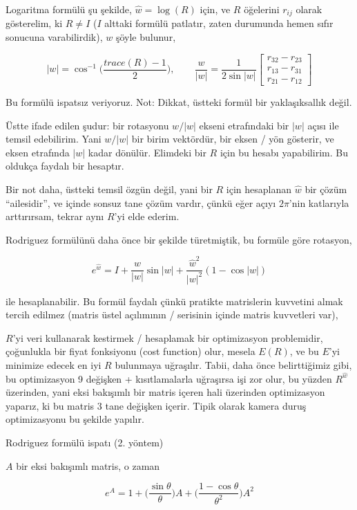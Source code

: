 \documentclass[12pt,fleqn]{article}\usepackage{../../common}
\begin{document}
Logaritma formülü şu şekilde, $\hat{w} = \log(R)$ için, ve $R$ öğelerini
$r_{ij}$ olarak gösterelim, ki $R \ne I$ ($I$ alttaki formülü patlatır,
zaten durumunda hemen sıfır sonucuna varabilirdik), $w$ şöyle bulunur,

$$ |w| = 
\cos^{-1} \bigg(
\frac{trace(R) - 1}{2}
\bigg), 
\qquad
\frac{w}{|w|} = 
\frac{1}{2 \sin |w|} 
\left[\begin{array}{r}
r_{32} - r_{23} \\ r_{13} - r_{31} \\ r_{21} - r_{12}
\end{array}\right]
 $$

Bu formülü ispatsız veriyoruz. Not: Dikkat, üstteki formül bir yaklaşıksallık
değil. 

Üstte ifade edilen şudur: bir rotasyonu $w/|w|$ ekseni etrafındaki bir
$|w|$ açısı ile temsil edebilirim. Yani $w/|w|$ bir birim vektördür, bir
eksen / yön gösterir, ve eksen etrafında $|w|$ kadar dönülür. Elimdeki bir
$R$ için bu hesabı yapabilirim. Bu oldukça faydalı bir hesaptır. 

Bir not daha, üstteki temsil özgün değil, yani bir $R$ için hesaplanan
$\hat{w}$ bir çözüm ``ailesidir'', ve içinde sonsuz tane çözüm vardır,
çünkü eğer açıyı $2\pi$'nin katlarıyla arttırırsam, tekrar aynı $R$'yi elde
ederim.

Rodriguez formülünü daha önce bir şekilde türetmiştik, bu formüle göre
rotasyon,

$$ e^{\hat{w}} = I + \frac{\hat{w}}{|w|} \sin |w| + 
\frac{\hat{w}^2}{|w|^2} (1-\cos |w|)
 $$

ile hesaplanabilir. Bu formül faydalı çünkü pratikte matrislerin 
kuvvetini almak tercih edilmez (matris üstel açılımının / serisinin içinde
matris kuvvetleri var),

$R$'yi veri kullanarak kestirmek / hesaplamak bir optimizasyon problemidir,
çoğunlukla bir fiyat fonksiyonu (cost function) olur, mesela $E(R)$, ve bu
$E$'yi minimize edecek en iyi $R$ bulunmaya uğraşılır. Tabii, daha önce
belirttiğimiz gibi, bu optimizasyon 9 değişken + kısıtlamalarla uğraşırsa
işi zor olur, bu yüzden $R^{\hat{w}}$ üzerinden, yani eksi bakışımlı bir
matris içeren hali üzerinden optimizasyon yaparız, ki bu matris 3 tane
değişken içerir. Tipik olarak kamera duruş optimizasyonu bu şekilde
yapılır.

Rodriguez formülü ispatı (2. yöntem)

$A$ bir eksi bakışımlı matris, o zaman 

$$ e^{A} = 1 + 
\bigg(\frac{\sin \theta}{\theta} \bigg)A + 
\bigg(\frac{1 - \cos \theta}{\theta^2} \bigg)A^2 $$
\end{document}
